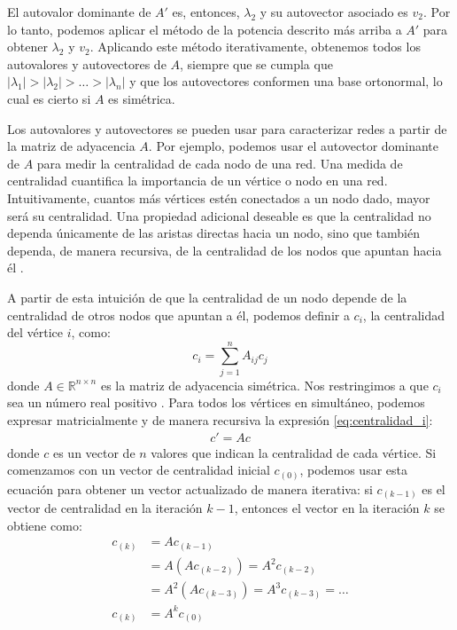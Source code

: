 \documentclass{article}
\begin{document}
El autovalor dominante de $A'$ es, entonces, $\lambda_2$ y su autovector asociado es $v_2$. Por lo tanto, podemos aplicar el método de la potencia descrito más arriba a $A'$ para obtener $\lambda_2$ y $v_2$. Aplicando este método iterativamente, obtenemos todos los autovalores y autovectores de $A$, siempre que se cumpla que $|\lambda_1| > |\lambda_2| > \ldots > |\lambda_n|$ y que los autovectores conformen una base ortonormal, lo cual es cierto si $A$ es simétrica.

Los autovalores y autovectores se pueden usar para caracterizar redes a partir de la matriz de adyacencia $A$. Por ejemplo, podemos usar el autovector dominante de $A$ para medir la centralidad de cada nodo de una red. Una medida de centralidad cuantifica la importancia de un vértice o nodo en una red. Intuitivamente, cuantos más vértices estén conectados a un nodo dado, mayor será su centralidad. Una propiedad adicional deseable es que la centralidad no dependa únicamente de las aristas directas hacia un nodo, sino que también dependa, de manera recursiva, de la centralidad de los nodos que apuntan hacia él \citep{zaki2014data}.

A partir de esta intuición de que la centralidad de un nodo depende de la centralidad de otros nodos que apuntan a él, podemos definir a $c_i$, la centralidad del vértice $i$, como:
%
\begin{equation} \label{eq:centralidad_i}
    c_i = \sum_{j=1}^{n} A_{ij} c_j
\end{equation}
%
donde $A \in \mathbb{R}^{n \times n}$ es la matriz de adyacencia simétrica. Nos restringimos a que $c_i$ sea un número real positivo \citep{zaki2014data}. Para todos los vértices en simultáneo, podemos expresar matricialmente y de manera recursiva la expresión \ref{eq:centralidad_i}:
%
\begin{align*}
    c' = A c
\end{align*}
%
donde $c$ es un vector de $n$ valores que indican la centralidad de cada vértice. Si comenzamos con un vector de centralidad inicial $c_{(0)}$, podemos usar esta ecuación para obtener un vector actualizado de manera iterativa: si $c_{(k-1)}$ es el vector de centralidad en la iteración $k - 1$, entonces el vector en la iteración $k$ se obtiene como:
%
\begin{equation} \label{eq:centralidad_secuencia}
\begin{split}
c_{(k)} &= A c_{(k-1)} \\
        &= A (A c_{(k-2)}) = A^2 c_{(k-2)} \\
        &= A^2 (A c_{(k-3)}) = A^3 c_{(k-3)} = \ldots \\
c_{(k)} &= A^k c_{(0)}
\end{split}
\end{equation}
%
\end{document}
